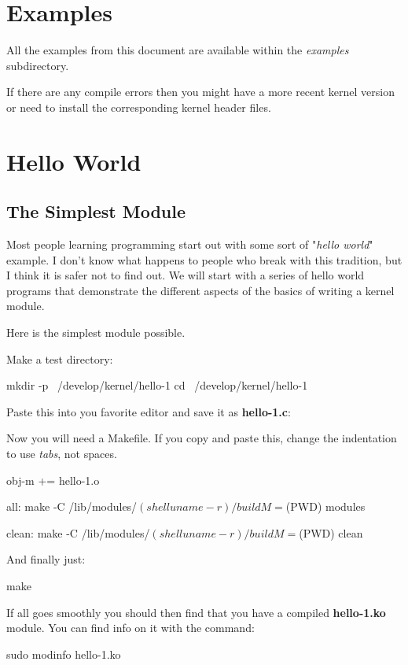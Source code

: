 \documentclass[10pt, oneside]{book}
\begin{document}
\section{Examples}
\label{sec:examples}
All the examples from this document are available within the \emph{examples} subdirectory.

If there are any compile errors then you might have a more recent kernel version or need to install the corresponding kernel header files.

\section{Hello World}
\label{sec:helloworld}
\subsection{The Simplest Module}
\label{sec:org2d3e245}
Most people learning programming start out with some sort of "\emph{hello world}" example.
I don't know what happens to people who break with this tradition, but I think it is safer not to find out.
We will start with a series of hello world programs that demonstrate the different aspects of the basics of writing a kernel module.

Here is the simplest module possible.

Make a test directory:
\begin{codebash}
mkdir -p ~/develop/kernel/hello-1
cd ~/develop/kernel/hello-1
\end{codebash}

Paste this into you favorite editor and save it as \textbf{hello-1.c}:


Now you will need a Makefile. If you copy and paste this, change the indentation to use \textit{tabs}, not spaces.

\begin{code}
obj-m += hello-1.o

all:
	make -C /lib/modules/$(shell uname -r)/build M=$(PWD) modules

clean:
	make -C /lib/modules/$(shell uname -r)/build M=$(PWD) clean
\end{code}

And finally just:
\begin{codebash}
make
\end{codebash}

If all goes smoothly you should then find that you have a compiled \textbf{hello-1.ko} module.
You can find info on it with the command:
\begin{codebash}
sudo modinfo hello-1.ko
\end{codebash}
\end{document}
